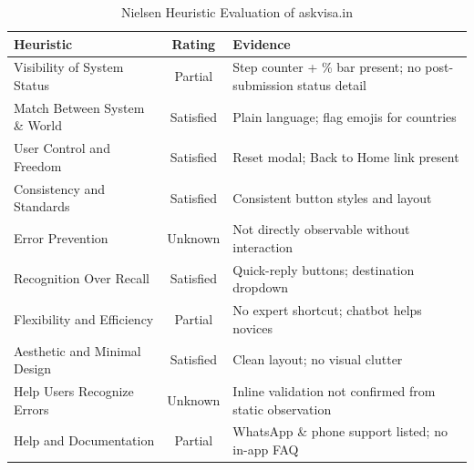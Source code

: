 \documentclass[journal, 10pt, twoside]{IEEEtran}
\begin{document}
\begin{table}[ht]
  \centering
  \caption{Nielsen Heuristic Evaluation of askvisa.in}
  \label{tab:heuristics}
  \begin{tabular}{@{}p{3.5cm} c p{2.6cm}@{}}
    \toprule
    \textbf{Heuristic} & \textbf{Rating} & \textbf{Evidence} \\
    \midrule
    Visibility of System Status     & Partial  & Step counter + \%
                                                 bar present; no
                                                 post-submission status
                                                 detail \\
    Match Between System \& World   & Satisfied & Plain language; flag
                                                  emojis for countries \\
    User Control and Freedom        & Satisfied & Reset modal; Back
                                                  to Home link present \\
    Consistency and Standards       & Satisfied & Consistent button
                                                  styles and layout \\
    Error Prevention                & Unknown   & Not directly
                                                  observable without
                                                  interaction \\
    Recognition Over Recall         & Satisfied & Quick-reply buttons;
                                                  destination dropdown \\
    Flexibility and Efficiency      & Partial  & No expert shortcut;
                                                  chatbot helps novices \\
    Aesthetic and Minimal Design    & Satisfied & Clean layout; no
                                                  visual clutter \\
    Help Users Recognize Errors     & Unknown   & Inline validation not
                                                  confirmed from static
                                                  observation \\
    Help and Documentation          & Partial  & WhatsApp \& phone
                                                 support listed; no
                                                 in-app FAQ \\
    \bottomrule
  \end{tabular}
\end{table}
\end{document}
